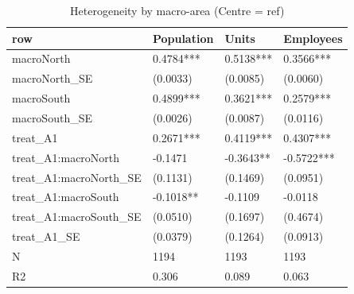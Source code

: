 \begin{table}

\caption{Heterogeneity by macro-area (Centre = ref)}
\centering
\begin{tabular}[t]{llll}
\toprule
row & Population & Units & Employees\\
\midrule
macroNorth & 0.4784*** & 0.5138*** & 0.3566***\\
macroNorth\_SE & (0.0033) & (0.0085) & (0.0060)\\
macroSouth & 0.4899*** & 0.3621*** & 0.2579***\\
macroSouth\_SE & (0.0026) & (0.0087) & (0.0116)\\
treat\_A1 & 0.2671*** & 0.4119*** & 0.4307***\\
\addlinespace
treat\_A1:macroNorth & -0.1471 & -0.3643** & -0.5722***\\
treat\_A1:macroNorth\_SE & (0.1131) & (0.1469) & (0.0951)\\
treat\_A1:macroSouth & -0.1018** & -0.1109 & -0.0118\\
treat\_A1:macroSouth\_SE & (0.0510) & (0.1697) & (0.4674)\\
treat\_A1\_SE & (0.0379) & (0.1264) & (0.0913)\\
\addlinespace
N & 1194 & 1193 & 1193\\
R2 & 0.306 & 0.089 & 0.063\\
\bottomrule
\end{tabular}
\end{table}
